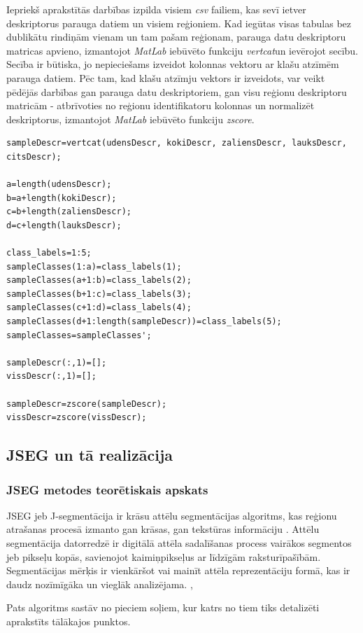 \documentclass[12pt,paper=a4]{report}
\begin{document}
Iepriekš aprakstītās darbības izpilda visiem \textit{csv} failiem, kas sevī ietver deskriptorus parauga datiem un visiem reģioniem. Kad iegūtas visas tabulas bez dublikātu rindiņām vienam un tam pašam reģionam, parauga datu deskriptoru matricas apvieno, izmantojot \textit{MatLab} iebūvēto funkciju \textit{vertcat}un ievērojot secību. Secība ir būtiska, jo nepieciešams izveidot kolonnas vektoru ar klašu atzīmēm parauga datiem. Pēc tam, kad klašu atzīmju vektors ir izveidots, var veikt pēdējās darbības gan parauga datu deskriptoriem, gan visu reģionu deskriptoru matricām - atbrīvoties no reģionu identifikatoru kolonnas un normalizēt deskriptorus, izmantojot \textit{MatLab} iebūvēto funkciju \textit{zscore}.
\begin{lstlisting}
sampleDescr=vertcat(udensDescr, kokiDescr, zaliensDescr, lauksDescr, citsDescr);

a=length(udensDescr);
b=a+length(kokiDescr);
c=b+length(zaliensDescr);
d=c+length(lauksDescr);

class_labels=1:5;
sampleClasses(1:a)=class_labels(1);
sampleClasses(a+1:b)=class_labels(2);
sampleClasses(b+1:c)=class_labels(3);
sampleClasses(c+1:d)=class_labels(4);
sampleClasses(d+1:length(sampleDescr))=class_labels(5);
sampleClasses=sampleClasses';

sampleDescr(:,1)=[];
vissDescr(:,1)=[];

sampleDescr=zscore(sampleDescr);
vissDescr=zscore(vissDescr);
\end{lstlisting}
\subsection{JSEG un tā realizācija}
\subsubsection{JSEG metodes teorētiskais apskats}JSEG jeb J-segmentācija ir krāsu attēlu segmentācijas algoritms, kas reģionu atrašanas procesā izmanto gan krāsas, gan tekstūras informāciju \cite{1colImSegm1999}. Attēlu segmentācija datorredzē ir digitālā attēla sadalīšanas process vairākos segmentos jeb pikseļu kopās, savienojot kaimiņpikseļus ar līdzīgām raksturīpašībām. Segmentācijas mērķis ir vienkāršot vai mainīt attēla reprezentāciju formā, kas ir daudz nozīmīgāka un vieglāk analizējama. \cite{shapiro2001computer}, \cite{cleve2008classification}\par
Pats algoritms sastāv no pieciem soļiem, kur katrs no tiem tiks detalizēti aprakstīts tālākajos punktos.
\end{document}
